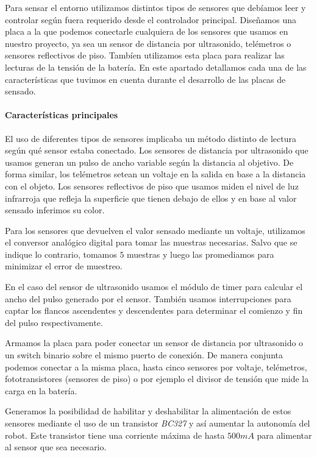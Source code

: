 Para sensar el entorno utilizamos distintos tipos de sensores que deb\'iamos leer y controlar seg\'un fuera
requerido desde el controlador principal.
Dise\~namos una placa a la que podemos conectarle cualquiera de los sensores que usamos en nuestro proyecto,
ya sea un sensor de distancia por ultrasonido, tel\'emetros o sensores reflectivos de piso.
Tamb\'ien utilizamos esta placa para realizar las lecturas de la tensi\'on de la bater\'ia.
En este apartado detallamos cada una de las caracter\'isticas que tuvimos en cuenta durante el desarrollo
de las placas de sensado.

\paragraph{Caracter\'isticas principales}
\label{h_placas_sensado_caracteristicas}

El uso de diferentes tipos de sensores implicaba un m\'etodo distinto de lectura seg\'un qu\'e sensor
estaba conectado.
Los sensores de distancia por ultrasonido que usamos generan un pulso de ancho variable seg\'un la
distancia al objetivo.
De forma similar, los tel\'emetros setean un voltaje en la salida en base a la
distancia con el objeto.
Los sensores reflectivos de piso que usamos miden el nivel de luz infrarroja que refleja la superficie
que tienen debajo de ellos y en base al valor sensado inferimos su color.

Para los sensores que devuelven el valor sensado mediante un voltaje, utilizamos el conversor anal\'ogico
digital para tomar las muestras necesarias.
Salvo que se indique lo contrario, tomamos $5$ muestras y luego las promediamos para minimizar el error
de muestreo.

En el caso del sensor de ultrasonido usamos el m\'odulo de timer para calcular el ancho del pulso
generado por el sensor.
Tambi\'en usamos interrupciones para captar los flancos ascendentes y descendentes para determinar el
comienzo y fin del pulso respectivamente.

Armamos la placa para poder conectar un sensor de distancia por ultrasonido o un switch binario sobre
el mismo puerto de conexi\'on.
De manera conjunta podemos conectar a la misma placa, hasta cinco sensores por voltaje, tel\'emetros,
fototransistores (sensores de piso) o por ejemplo el divisor de tensi\'on que mide la carga en la bater\'ia.

Generamos la posibilidad de habilitar y deshabilitar la alimentaci\'on de estos sensores mediante el uso
de un transistor \emph{BC327} y as\'i aumentar la autonom\'ia del robot.
Este transistor tiene una corriente m\'axima de hasta $500mA$ para alimentar al sensor que sea necesario.

